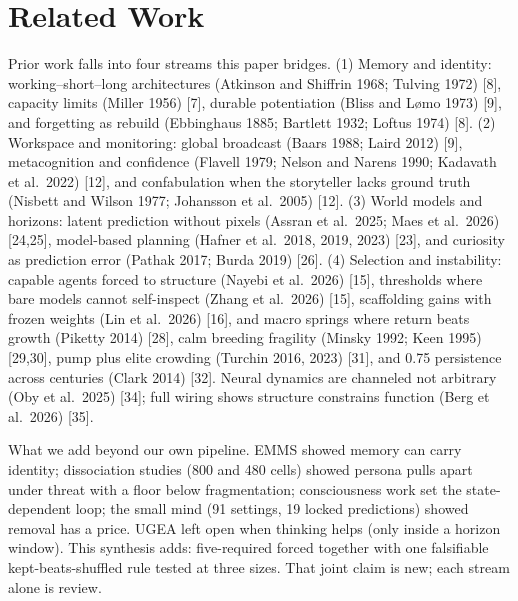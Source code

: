 \documentclass[11pt,a4paper]{article}
\begin{document}
\section{Related Work}
Prior work falls into four streams this paper bridges. (1) Memory and identity: working--short--long architectures (Atkinson and Shiffrin 1968; Tulving 1972) [8], capacity limits (Miller 1956) [7], durable potentiation (Bliss and L{\o}mo 1973) [9], and forgetting as rebuild (Ebbinghaus 1885; Bartlett 1932; Loftus 1974) [8]. (2) Workspace and monitoring: global broadcast (Baars 1988; Laird 2012) [9], metacognition and confidence (Flavell 1979; Nelson and Narens 1990; Kadavath et al.\ 2022) [12], and confabulation when the storyteller lacks ground truth (Nisbett and Wilson 1977; Johansson et al.\ 2005) [12]. (3) World models and horizons: latent prediction without pixels (Assran et al.\ 2025; Maes et al.\ 2026) [24,25], model-based planning (Hafner et al.\ 2018, 2019, 2023) [23], and curiosity as prediction error (Pathak 2017; Burda 2019) [26]. (4) Selection and instability: capable agents forced to structure (Nayebi et al.\ 2026) [15], thresholds where bare models cannot self-inspect (Zhang et al.\ 2026) [15], scaffolding gains with frozen weights (Lin et al.\ 2026) [16], and macro springs where return beats growth (Piketty 2014) [28], calm breeding fragility (Minsky 1992; Keen 1995) [29,30], pump plus elite crowding (Turchin 2016, 2023) [31], and 0.75 persistence across centuries (Clark 2014) [32]. Neural dynamics are channeled not arbitrary (Oby et al.\ 2025) [34]; full wiring shows structure constrains function (Berg et al.\ 2026) [35].

What we add beyond our own pipeline. EMMS showed memory can carry identity; dissociation studies (800 and 480 cells) showed persona pulls apart under threat with a floor below fragmentation; consciousness work set the state-dependent loop; the small mind (91 settings, 19 locked predictions) showed removal has a price. UGEA left open when thinking helps (only inside a horizon window). This synthesis adds: five-required forced together with one falsifiable kept-beats-shuffled rule tested at three sizes. That joint claim is new; each stream alone is review.
\end{document}
